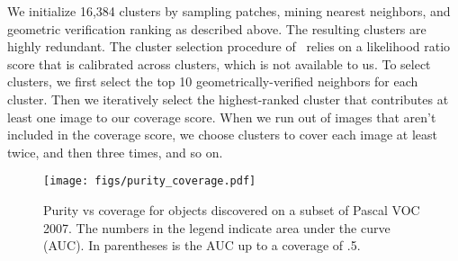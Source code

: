 \documentclass[10pt,twocolumn,letterpaper]{article}
\begin{document}
 We initialize 16,384 clusters by sampling patches, mining nearest neighbors, and geometric verification ranking as described above.  The resulting clusters are highly redundant.
The cluster selection procedure of~\cite{doersch2014context} relies on a likelihood ratio score that is calibrated across clusters, which is not available to us.  
To select clusters, we first select the top 10 geometrically-verified neighbors for each cluster.  Then we iteratively select the highest-ranked cluster that contributes at least one image to our coverage score.  When we run out of images that aren't included in the coverage score, we choose clusters to cover each image at least twice, and then three times, and so on.  


\begin{figure}[t]
\begin{center}
   \texttt{[image: figs/purity\_coverage.pdf]}
   \vspace{-.2in}
\end{center}
   \caption{Purity vs coverage for objects discovered on a subset of Pascal VOC 2007. The numbers in the legend indicate area under the curve (AUC). In parentheses is the AUC up to a coverage of .5.}
   \vspace{-.2in}
\label{fig:purcov}
\end{figure}




\end{document}
